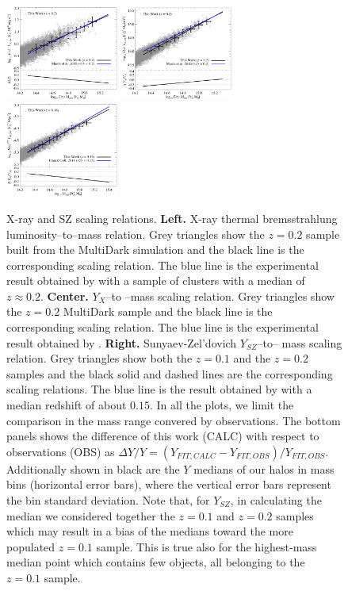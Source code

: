 \documentclass[traditabstract]{aa}
\begin{document}
\begin{figure}[hbt!]
\centering
\includegraphics[width=0.33\textwidth]{figures/lx_m.eps}
\includegraphics[width=0.33\textwidth]{figures/yx_m.eps}
\includegraphics[width=0.33\textwidth]{figures/sz_m.eps}
\caption{X-ray and SZ scaling relations. {\bf Left.} X-ray thermal bremsstrahlung luminosity--to--mass relation. Grey triangles show the $z=0.2$ sample built from the MultiDark simulation and the black line is the corresponding scaling relation. The blue line is the experimental result obtained by \cite{2010MNRAS.406.1773M} with a sample of clusters with a median of $z \approx 0.2$. {\bf Center.} $Y_{X}$--to --mass scaling relation. Grey triangles show the $z=0.2$ MultiDark sample and the black line is the corresponding scaling relation. The blue line is the experimental result obtained by \cite{2010MNRAS.406.1773M}. {\bf Right.} Sunyaev-Zel'dovich $Y_{SZ}$--to-- mass scaling relation. Grey triangles show both the $z=0.1$ and the $z=0.2$ samples and the black solid and dashed lines are the corresponding scaling relations. The blue line is the result obtained by \cite{2011A&A...536A..11P} with a median redshift of about $0.15$. In all the plots, we limit the comparison in the mass range convered by observations. The bottom panels shows the difference of this work (CALC) with respect to observations (OBS) as $\Delta Y/Y = (Y_{FIT,CALC}-Y_{FIT,OBS})/Y_{FIT,OBS}$. Additionally shown in black are the $Y$ medians of our halos in mass bins (horizontal error bars), where the vertical error bars represent the bin standard deviation. Note that, for $Y_{SZ}$, in calculating the median we considered together the $z=0.1$ and $z=0.2$ samples which may result in a bias of the medians toward the more populated $z=0.1$ sample. This is true also for the highest-mass median point which contains few objects, all belonging to the $z=0.1$ sample.}
\label{fig:X_LM}
\end{figure}
\end{document}
